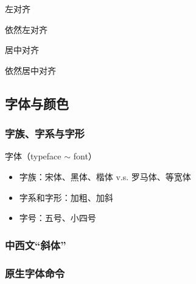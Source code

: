 \documentclass[twoside]{ctexart}
\begin{document}
            {\raggedright 左对齐\par
            依然左对齐\par
            }

            {\centering 居中对齐
            \par 依然居中对齐
            
            }


    \subsection{字体与颜色}
        \subsubsection{字族、字系与字形}
            字体（typeface $\sim$ font）
            \begin{itemize}
                \item 字族：宋体、黑体、楷体 v.s. 罗马体、等宽体
                \item 字系和字形：加粗、加斜
                \item 字号：五号、小四号
            \end{itemize}

        \subsubsection{中西文“斜体”}
        \subsubsection{原生字体命令}
        
\end{document}
